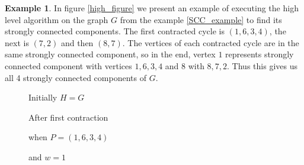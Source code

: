 \documentclass{report}
\theoremstyle{plain}
\theoremstyle{definition}
\newtheorem{example}{Example}
\theoremstyle{remark}
\numberwithin{definition}{chapter}
\numberwithin{example}{chapter}
\numberwithin{figure}{chapter}
\numberwithin{theorem}{chapter}
\numberwithin{lemma}{chapter}
\begin{document}
\begin{example}

In figure \ref{high_figure} we present an example of executing the high level algorithm on the graph $G$ from the example \ref{SCC_example} to find its strongly connected components. The first contracted cycle is $(1,6,3,4)$, the next is $(7,2)$ and then $(8,7)$. The vertices of each contracted cycle are in the same strongly connected component, so in the end, vertex $1$ represents strongly connected component with vertices $1,6,3,4$ and $8$ with $8,7,2$. Thus this gives us all 4 strongly connected components of $G$.

\begin{figure}[h]
\center

\begin{minipage}[h]{0.24\textwidth}

Initially $H=G$
\end{minipage}
\hfill
{}

After first contraction

when $P=(1,6,3,4)$

and $w=1$
\endminipage\hfill
{}


\end{figure}
\end{example}
\end{document}
